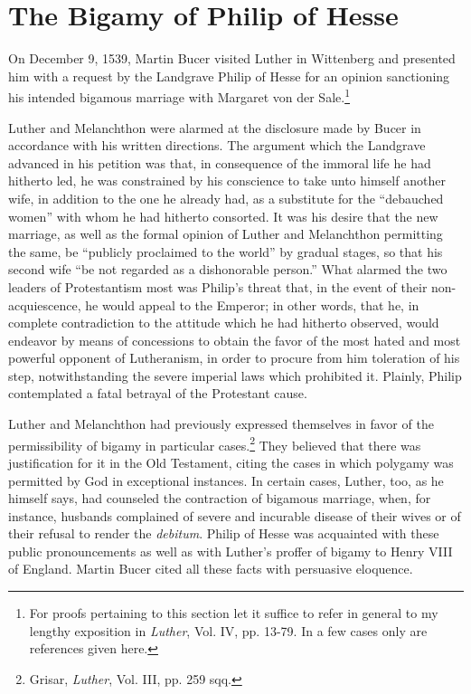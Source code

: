 \section{The Bigamy of Philip of Hesse}

On December 9, 1539, Martin Bucer visited Luther in Wittenberg
and presented him with a request by the Landgrave Philip of
Hesse for an opinion sanctioning his intended bigamous marriage with
Margaret von der Sale.\footnote
{For proofs pertaining to this section let it suffice to refer in general to my lengthy
exposition in \textit{Luther}, Vol. IV, pp. 13-79. In a few cases only are references given here.}

Luther and Melanchthon were alarmed at the disclosure made by
Bucer in accordance with his written directions. The argument which
the Landgrave advanced in his petition was that, in consequence of
the immoral life he had hitherto led, he was constrained by his conscience
to take unto himself another wife, in addition to the one he
already had, as a substitute for the “debauched women” with whom
he had hitherto consorted. It was his desire that the new marriage, as
well as the formal opinion of Luther and Melanchthon permitting the
same, be “publicly proclaimed to the world” by gradual stages, so that
his second wife “be not regarded as a dishonorable person.” What
alarmed the two leaders of Protestantism most was Philip’s threat
that, in the event of their non-acquiescence, he would appeal to the
Emperor; in other words, that he, in complete contradiction to the
attitude which he had hitherto observed, would endeavor by means
of concessions to obtain the favor of the most hated and most powerful
opponent of Lutheranism, in order to procure from him toleration of his
step, notwithstanding the severe imperial laws which prohibited
it. Plainly, Philip contemplated a fatal betrayal of the Protestant cause.

Luther and Melanchthon had previously expressed themselves in
favor of the permissibility of bigamy in particular cases.\footnote{Grisar, \textit{Luther}, Vol. III, pp. 259 sqq.}
 They believed
that there was justification for it in the Old Testament, citing
the cases in which polygamy was permitted by God in exceptional instances.
In certain cases, Luther, too, as he himself says, had counseled
the contraction of bigamous marriage, when, for instance, husbands
complained of severe and incurable disease of their wives or of their
refusal to render the \textit{debitum}. Philip of Hesse was acquainted with
these public pronouncements as well as with Luther’s proffer of bigamy
to Henry VIII of England. Martin Bucer cited all these facts
with persuasive eloquence.

